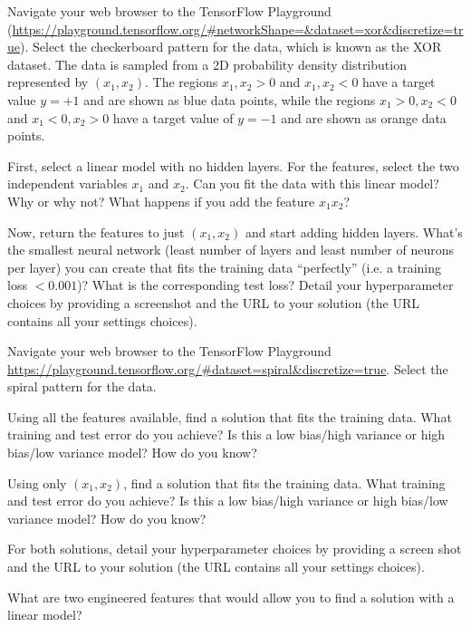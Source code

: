 \begin{problem}[6]
Navigate your web browser to the TensorFlow Playground (\url{https://playground.tensorflow.org/#networkShape=&dataset=xor&discretize=true}).
Select the checkerboard pattern for the data, which is known as the XOR dataset.
The data is sampled from a 2D probability density distribution represented by $(x_1, x_2)$.
The regions $x_1, x_2 > 0$ and $x_1, x_2 < 0$ have a target value $y = +1$ and are shown as blue data points, while the regions $x_1 > 0, x_2 < 0$ and $x_1 < 0, x_2 > 0$ have a target value of $y=-1$ and are shown as orange data points.

First, select a linear model with no hidden layers.
For the features, select the two independent variables $x_1$ and $x_2$.
Can you fit the data with this linear model?
Why or why not?
What happens if you add the feature $x_1x_2$?

Now, return the features to just $(x_1, x_2)$ and start adding hidden layers.
What's the smallest neural network (least number of layers and least number of neurons per layer) you can create that fits the training data ``perfectly'' (i.e. a training loss ${<}0.001$)? What is the corresponding test loss?
Detail your hyperparameter choices by providing a screenshot and the URL to your solution (the URL contains all your settings choices).
\end{problem}

\begin{solution}

\end{solution}

\begin{problem}[8]
Navigate your web browser to the TensorFlow Playground \url{https://playground.tensorflow.org/#dataset=spiral&discretize=true}.
Select the spiral pattern for the data.

Using all the features available, find a solution that fits the training data.
What training and test error do you achieve?
Is this a low bias/high variance or high bias/low variance model?
How do you know?

Using only $(x_1, x_2)$, find a solution that fits the training data.
What training and test error do you achieve?
Is this a low bias/high variance or high bias/low variance model?
How do you know?

For both solutions, detail your hyperparameter choices by providing a screen shot and the URL to your solution (the URL contains all your settings choices).

What are two engineered features that would allow you to find a solution with a linear model?
\end{problem}

\begin{solution}

\end{solution}


